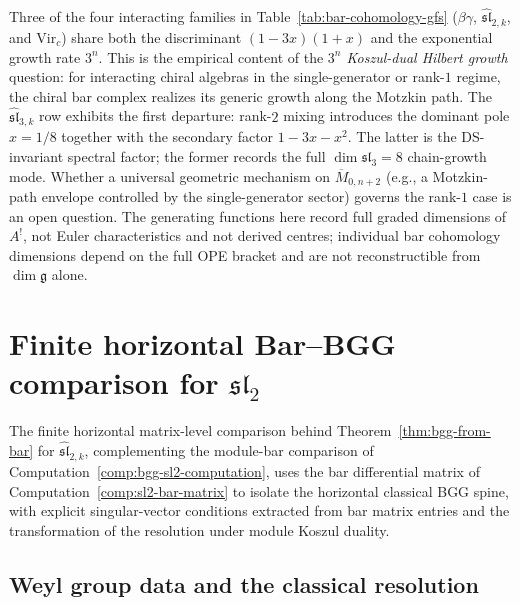 \begin{remark}
\label{rem:three-to-the-n-conjecture}
Three of the four interacting families in
Table~\ref{tab:bar-cohomology-gfs} ($\beta\gamma$,
$\widehat{\mathfrak{sl}}_{2,k}$, and $\mathrm{Vir}_c$) share both
the discriminant $(1 - 3x)(1 + x)$ and the exponential growth rate
$3^n$. This is the empirical content of the \emph{$3^n$
Koszul-dual Hilbert growth} question: for interacting chiral algebras in
the single-generator or rank-$1$ regime, the chiral bar complex
realizes its generic growth along the Motzkin path. The
$\widehat{\mathfrak{sl}}_{3,k}$ row exhibits the first departure:
rank-$2$ mixing introduces the dominant pole $x=1/8$ together with
the secondary factor $1-3x-x^2$. The latter is the DS-invariant
spectral factor; the former records the full
$\dim\mathfrak{sl}_3=8$ chain-growth mode. Whether a universal geometric mechanism on
$\overline{M}_{0,n+2}$ (e.g., a Motzkin-path envelope controlled by
the single-generator sector) governs the rank-$1$ case is an open
question. The generating functions here record full
graded dimensions of $A^!$, not Euler characteristics and not derived
centres; individual bar cohomology dimensions depend on the full OPE bracket and are not
reconstructible from $\dim \mathfrak{g}$ alone.
\end{remark}


\section{Finite horizontal Bar--BGG comparison for
\texorpdfstring{$\mathfrak{sl}_2$}{sl-2}}
\label{sec:bgg-sl2-computation}

The finite horizontal matrix-level comparison behind
Theorem~\ref{thm:bgg-from-bar} for
$\widehat{\mathfrak{sl}}_{2,k}$, complementing the
module-bar comparison of
Computation~\ref{comp:bgg-sl2-computation}, uses the bar
differential matrix of Computation~\ref{comp:sl2-bar-matrix}
to isolate the horizontal classical BGG spine, with explicit singular-vector
conditions extracted from bar matrix entries and the
transformation of the resolution under module Koszul duality.

\subsection{Weyl group data and the classical resolution}


